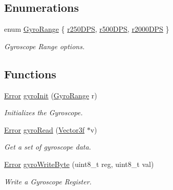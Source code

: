 \subsection*{Enumerations}
\begin{DoxyCompactItemize}
\item 
enum \hyperlink{group__gyro_ga12b0e0572fdceaa90874f9364c862ead}{Gyro\-Range} \{ \hyperlink{group__gyro_gga12b0e0572fdceaa90874f9364c862eadad13cb337046598ead5e1fd8de0536efd}{r250\-D\-P\-S}, 
\hyperlink{group__gyro_gga12b0e0572fdceaa90874f9364c862eadad107e50e2c89475d879bbb777f658ab3}{r500\-D\-P\-S}, 
\hyperlink{group__gyro_gga12b0e0572fdceaa90874f9364c862eada738587d78e73a4947f7d00572e6a09b3}{r2000\-D\-P\-S}
 \}
\begin{DoxyCompactList}\small\item\em Gyroscope Range options. \end{DoxyCompactList}\end{DoxyCompactItemize}
\subsection*{Functions}
\begin{DoxyCompactItemize}
\item 
\hyperlink{group__error_ga2c3e4bb40f36b262a5214e2da2bca9c5}{Error} \hyperlink{group__gyro_ga276b9ab6ac85c65b5a55356c00958be7}{gyro\-Init} (\hyperlink{group__gyro_ga12b0e0572fdceaa90874f9364c862ead}{Gyro\-Range} r)
\begin{DoxyCompactList}\small\item\em Initializes the Gyroscope. \end{DoxyCompactList}\item 
\hyperlink{group__error_ga2c3e4bb40f36b262a5214e2da2bca9c5}{Error} \hyperlink{group__gyro_gab90a6ac7c268152edb186ee699462fd8}{gyro\-Read} (\hyperlink{struct_vector3f}{Vector3f} $\ast$v)
\begin{DoxyCompactList}\small\item\em Get a set of gyroscope data. \end{DoxyCompactList}\item 
\hyperlink{group__error_ga2c3e4bb40f36b262a5214e2da2bca9c5}{Error} \hyperlink{group__gyro_ga779a6d1a0641fc1ddc530366f582961b}{gyro\-Write\-Byte} (uint8\-\_\-t reg, uint8\-\_\-t val)
\begin{DoxyCompactList}\small\item\em Write a Gyroscope Register. \end{DoxyCompactList}\end{DoxyCompactItemize}
